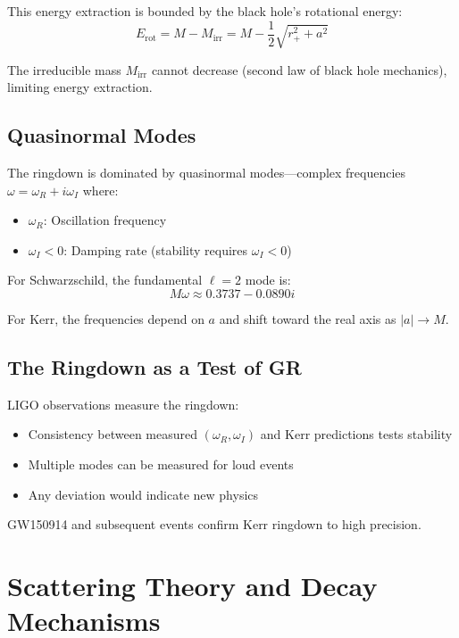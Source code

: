 \documentclass[12pt,a4paper]{article}
\begin{document}
This energy extraction is bounded by the black hole's rotational energy:
\begin{equation}
E_{\text{rot}} = M - M_{\text{irr}} = M - \frac{1}{2}\sqrt{r_+^2 + a^2}
\end{equation}

The irreducible mass $M_{\text{irr}}$ cannot decrease (second law of black hole mechanics), limiting energy extraction.

\subsection{Quasinormal Modes}

The ringdown is dominated by quasinormal modes---complex frequencies $\omega = \omega_R + i\omega_I$ where:
\begin{itemize}
    \item $\omega_R$: Oscillation frequency
    \item $\omega_I < 0$: Damping rate (stability requires $\omega_I < 0$)
\end{itemize}

For Schwarzschild, the fundamental $\ell = 2$ mode is:
\begin{equation}
M\omega \approx 0.3737 - 0.0890i
\end{equation}

For Kerr, the frequencies depend on $a$ and shift toward the real axis as $|a| \to M$.

\subsection{The Ringdown as a Test of GR}

LIGO observations measure the ringdown:
\begin{itemize}
    \item Consistency between measured $(\omega_R, \omega_I)$ and Kerr predictions tests stability
    \item Multiple modes can be measured for loud events
    \item Any deviation would indicate new physics
\end{itemize}

GW150914 and subsequent events confirm Kerr ringdown to high precision.

\section{Scattering Theory and Decay Mechanisms}
\end{document}
